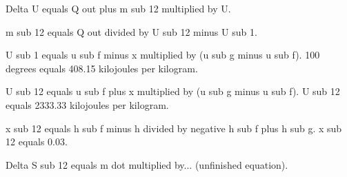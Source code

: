 Delta U equals Q out plus m sub 12 multiplied by U.  

m sub 12 equals Q out divided by U sub 12 minus U sub 1.  

U sub 1 equals u sub f minus x multiplied by (u sub g minus u sub f).  
100 degrees equals 408.15 kilojoules per kilogram.  

U sub 12 equals u sub f plus x multiplied by (u sub g minus u sub f).  
U sub 12 equals 2333.33 kilojoules per kilogram.  

x sub 12 equals h sub f minus h divided by negative h sub f plus h sub g.  
x sub 12 equals 0.03.  

Delta S sub 12 equals m dot multiplied by... (unfinished equation).